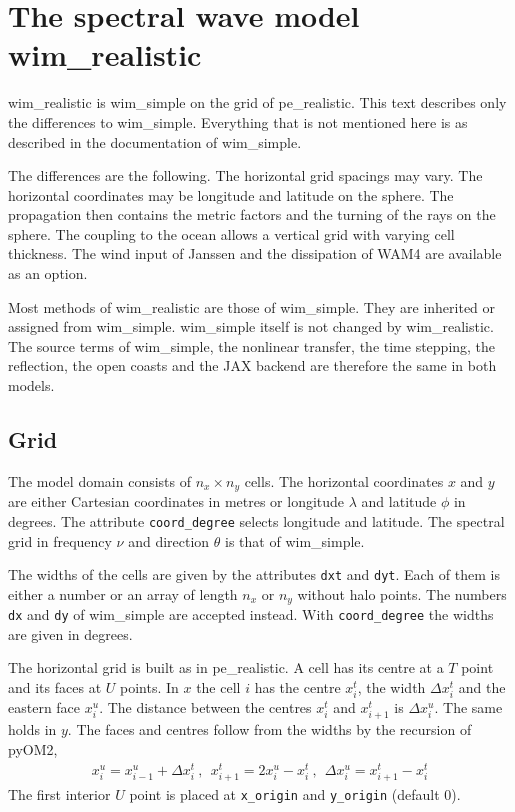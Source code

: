 \documentclass[12pt]{article}
\newcommand{\beq}  { \begin{eqnarray} }
\newcommand{\eeq}  { \end{eqnarray}}
\begin{document}
 \section*{The spectral wave model wim\_realistic}

wim\_realistic is wim\_simple on the grid of pe\_realistic.
This text describes only the differences to wim\_simple.
Everything that is not mentioned here is as described in the documentation of wim\_simple.

The differences are the following.
The horizontal grid spacings may vary.
The horizontal coordinates may be longitude and latitude on the sphere.
The propagation then contains the metric factors and the turning of the rays on the sphere.
The coupling to the ocean allows a vertical grid with varying cell thickness.
The wind input of Janssen and the dissipation of WAM4 are available as an option.

Most methods of wim\_realistic are those of wim\_simple.
They are inherited or assigned from wim\_simple.
wim\_simple itself is not changed by wim\_realistic.
The source terms of wim\_simple, the nonlinear transfer, the time stepping, the reflection, the open coasts and the JAX backend are therefore the same in both models.

\subsection*{Grid}

The model domain consists of $n_x \times n_y$ cells.
The horizontal coordinates $x$ and $y$ are either Cartesian coordinates in metres or longitude $\lambda$ and latitude $\phi$ in degrees.
The attribute \verb|coord_degree| selects longitude and latitude.
The spectral grid in frequency $\nu$ and direction $\theta$ is that of wim\_simple.

The widths of the cells are given by the attributes \verb|dxt| and \verb|dyt|.
Each of them is either a number or an array of length $n_x$ or $n_y$ without halo points.
The numbers \verb|dx| and \verb|dy| of wim\_simple are accepted instead.
With \verb|coord_degree| the widths are given in degrees.

The horizontal grid is built as in pe\_realistic.
A cell has its centre at a $T$ point and its faces at $U$ points.
In $x$ the cell $i$ has the centre $x^t_i$, the width $\Delta x^t_i$ and the eastern face $x^u_i$.
The distance between the centres $x^t_i$ and $x^t_{i+1}$ is $\Delta x^u_i$.
The same holds in $y$.
The faces and centres follow from the widths by the recursion of pyOM2,
\beq \label{eq:ucentred_w}
 x^u_i = x^u_{i-1} + \Delta x^t_i ~,~~
 x^t_{i+1} = 2 x^u_i - x^t_i ~,~~
 \Delta x^u_i = x^t_{i+1} - x^t_i
\eeq
The first interior $U$ point is placed at \verb|x_origin| and \verb|y_origin| (default 0).
\end{document}
